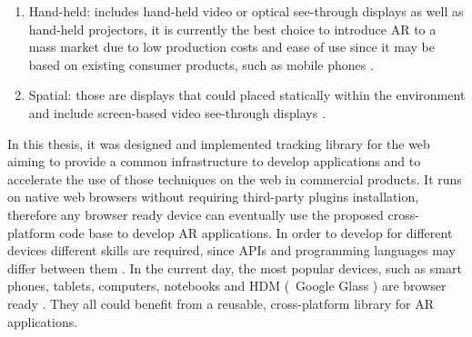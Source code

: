 \begin{enumerate}
\begin{enumerate}
      \item Hand-held: includes hand-held video or optical see-through displays as well as hand-held projectors, it is currently the best choice to introduce AR to a mass market due to low production costs and ease of use since it may be based on existing consumer products, such as mobile phones \cite{Benford1998}.
      \item Spatial: those are displays that could placed statically within the environment and include screen-based video see-through displays \cite{Benford1998}.
    \end{enumerate}
\end{enumerate}

In this thesis, it was designed and implemented tracking library for the web aiming to provide a common infrastructure to develop applications and to accelerate the use of those techniques on the web in commercial products. It runs on native web browsers without requiring third-party plugins installation, therefore any browser ready device can eventually use the proposed cross-platform code base to develop AR applications. In order to develop for different devices different skills are required, since APIs and programming languages may differ between them \cite{MDN2013,International2009}. In the current day, the most popular devices, such as smart phones, tablets, computers, notebooks and HDM (\ie\ Google Glass \cite{Glass2013}) \cite{Benford1998} are browser ready \cite{Hickson2013}. They all could benefit from a reusable, cross-platform library for AR applications.


